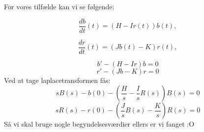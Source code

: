 For vores tilfælde kan vi se følgende:

\begin{equation*}
    \dfrac{db}{dt}(t) = (H-Ir(t)) b(t), 
\end{equation*}

\begin{equation*}
    \dfrac{dr}{dt}(t) = (Jb(t)-K) r(t),
\end{equation*}

$$b' - (H - Ir)b = 0 $$
$$r' - (Jb - K)r = 0 $$
Ved at tage laplacetransformen fås:
$$sB(s) - b(0) - (\frac{H}{s} - \frac{I}{s}R(s))B(s) = 0$$
$$sR(s) - r(0) - (\frac{J}{s}B(s) - \frac{K}{s})R(s) = 0$$
Så vi skal bruge nogle begyndelsesværdier ellers er vi fanget :O
